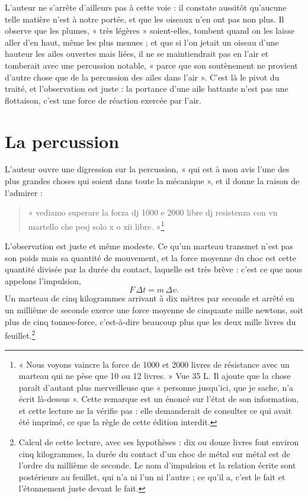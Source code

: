 \documentclass[11pt,a4paper]{article}
\begin{document}
L'auteur ne s'arrête d'ailleurs pas à cette voie : il constate aussitôt qu'aucune
telle matière n'est à notre portée, et que les oiseaux n'en ont pas non plus. Il
observe que les plumes, « très légères » soient-elles, tombent quand on les
laisse aller d'en haut, même les plus menues ; et que si l'on jetait un oiseau
d'une hauteur les ailes ouvertes mais liées, il ne se maintiendrait pas en l'air
et tomberait avec une percussion notable, « parce que son soutènement ne provient
d'autre chose que de la percussion des ailes dans l'air ». C'est là le pivot du
traité, et l'observation est juste : la portance d'une aile battante n'est pas
une flottaison, c'est une force de réaction exercée par l'air.

\section*{La percussion}

L'auteur ouvre une digression sur la percussion, « qui est à mon avis l'une des
plus grandes choses qui soient dans toute la mécanique », et il donne la raison
de l'admirer :

\begin{quote}
« vediamo superare la forza dj 1000 e 2000 libre dj resistenza con vn martello
che pesj solo x o xii libre. »\footnote{« Nous voyons vaincre la force de 1000 et
2000 livres de résistance avec un marteau qui ne pèse que 10 ou 12 livres. »
Vue 35 L. Il ajoute que la chose paraît d'autant plus merveilleuse que
« personne jusqu'ici, que je sache, n'a écrit là-dessus ». Cette remarque est un
énoncé sur l'état de son information, et cette lecture ne la vérifie pas : elle
demanderait de consulter ce qui avait été imprimé, ce que la règle de cette
édition interdit.}
\end{quote}

L'observation est juste et même modeste. Ce qu'un marteau transmet n'est pas son
poids mais sa quantité de mouvement, et la force moyenne du choc est cette
quantité divisée par la durée du contact, laquelle est très brève : c'est ce que
nous appelons l'impulsion,
\[ F\,\Delta t = m\,\Delta v. \]
Un marteau de cinq kilogrammes arrivant à dix mètres par seconde et arrêté en un
millième de seconde exerce une force moyenne de cinquante mille newtons, soit
plus de cinq tonnes-force, c'est-à-dire beaucoup plus que les deux mille livres
du feuillet.\footnote{Calcul de cette lecture, avec ses hypothèses : dix ou douze
livres font environ cinq kilogrammes, la durée du contact d'un choc de métal sur
métal est de l'ordre du millième de seconde. Le nom d'impulsion et la relation
écrite sont postérieurs au feuillet, qui n'a ni l'un ni l'autre ; ce qu'il a,
c'est le fait et l'étonnement juste devant le fait.}
\end{document}
